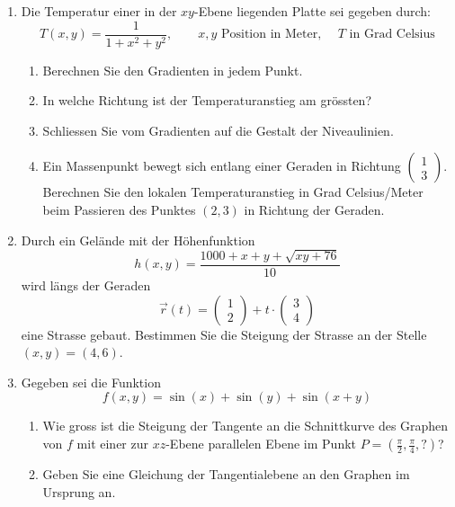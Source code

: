 \begin{ueb}
\begin{enumerate}
		\item Die Temperatur einer in der \( xy \)-Ebene liegenden Platte sei gegeben durch:
		      \[
			      T(x, y) = \frac{1}{1 + x^2 + y^2}, \qquad x,y \text{ Position in Meter, } \quad T \text{ in Grad Celsius}
		      \]
		      \begin{enumerate}
			      \item Berechnen Sie den Gradienten in jedem Punkt.
			      \item In welche Richtung ist der Temperaturanstieg am grössten?
			      \item Schliessen Sie vom Gradienten auf die Gestalt der Niveaulinien.
			      \item Ein Massenpunkt bewegt sich entlang einer Geraden in Richtung $\begin{pmatrix}
					            1 \\ 3
				            \end{pmatrix}$. Berechnen Sie den lokalen Temperaturanstieg in Grad Celsius/Meter beim Passieren des Punktes \( (2, 3) \) in Richtung der Geraden.
		      \end{enumerate}

		\item Durch ein Gelände mit der Höhenfunktion
		      \[
			      h(x, y) = \frac{1000 + x + y + \sqrt{xy + 76}}{10}
		      \]
		      wird längs der Geraden
		      \[
			      \vec{r}(t) = \begin{pmatrix} 1 \\ 2 \end{pmatrix} + t \cdot \begin{pmatrix} 3 \\ 4 \end{pmatrix}
		      \]
		      eine Strasse gebaut. Bestimmen Sie die Steigung der Strasse an der Stelle \( (x, y) = (4, 6) \).

		\item Gegeben sei die Funktion
		      \[
			      f(x, y) = \sin(x) + \sin(y) + \sin(x + y)
		      \]
		      \begin{enumerate}
			      \item Wie gross ist die Steigung der Tangente an die Schnittkurve des Graphen von \( f \) mit einer zur \( xz \)-Ebene parallelen Ebene im Punkt \( P = \left( \frac{\pi}{2}, \frac{\pi}{4}, ? \right) \)?
			      \item Geben Sie eine Gleichung der Tangentialebene an den Graphen im Ursprung an.
		      \end{enumerate}
	\end{enumerate}
\end{ueb}



